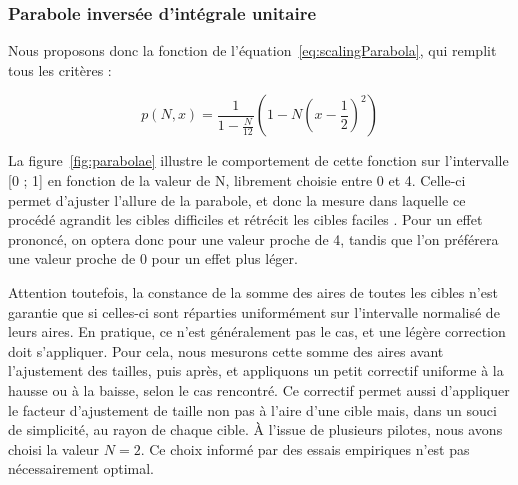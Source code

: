 	\subsubsection{Parabole inversée d'intégrale unitaire}
	Nous proposons donc la fonction de l'équation~\ref{eq:scalingParabola}, qui remplit tous les critères :
	
	\begin{equation}
		p(N,x) = \frac{1}{1-\frac{N}{12}} \left(1-N\left(x-\frac{1}{2}\right)^2\right)
		\label{eq:scalingParabola}
	\end{equation}
	
	La figure~\ref{fig:parabolae} illustre le comportement de cette fonction sur l'intervalle [0 ; 1] en fonction de la valeur de N, librement choisie entre 0 et 4. Celle-ci permet d'ajuster l'allure de la parabole, et donc la mesure dans laquelle ce procédé agrandit les cibles \og difficiles \fg{} et rétrécit les cibles \og faciles \fg{}. Pour un effet prononcé, on optera donc pour une valeur proche de 4, tandis que l'on préférera une valeur proche de 0 pour un effet plus léger.
	
	Attention toutefois, la constance de la somme des aires de toutes les cibles n'est garantie que si celles-ci sont réparties uniformément sur l'intervalle normalisé de leurs aires.\footnotemark{} En pratique, ce n'est généralement pas le cas, et une légère correction doit s'appliquer. Pour cela, nous mesurons cette somme des aires avant l'ajustement des tailles, puis après, et appliquons un petit correctif uniforme à la hausse ou à la baisse, selon le cas rencontré. Ce correctif permet aussi d'appliquer le facteur d'ajustement de taille non pas à l'aire d'une cible mais, dans un souci de simplicité, au rayon de chaque cible. À l'issue de plusieurs pilotes, nous avons choisi la valeur $N=2$. Ce choix informé par des essais empiriques n'est pas nécessairement optimal.

	
	
